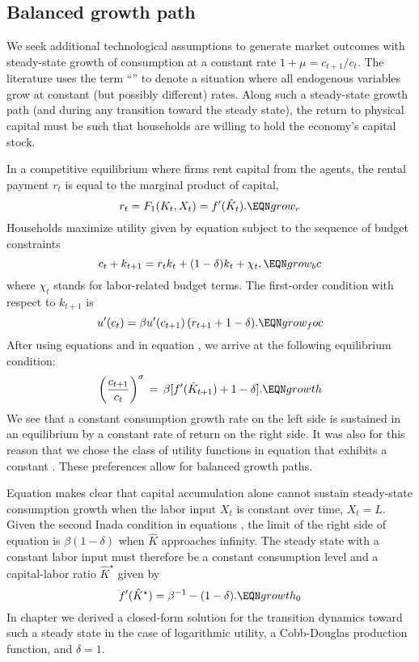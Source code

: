 \subsection{Balanced growth path}

We seek additional technological assumptions to
generate market outcomes with steady-state growth of consumption at a
constant rate $1+\mu=c_{t+1}/c_t$. The literature uses the term
``'' to denote a situation
where all endogenous variables grow at constant (but possibly different)
rates. Along such a steady-state growth path (and
during any transition toward the steady state), the return to
physical capital must be such that households are willing to hold the
economy's capital stock.

In a competitive equilibrium where firms
rent capital from the agents, the rental payment $r_t$ is equal to the
marginal product of capital,
$$
r_t = F_1(K_t,X_t) = f'(\hat K_t).                             \EQN grow_r
$$
Households
maximize utility given by equation  subject to the sequence of
 budget constraints
$$
c_t + k_{t+1} = r_t k_t + (1-\delta) k_t + \chi_t,         \EQN grow_bc
$$
where $\chi_t$ stands for labor-related budget terms. The
first-order condition with respect to $k_{t+1}$ is
$$
u'(c_t) = \beta u'(c_{t+1})\, (r_{t+1} + 1 - \delta).        \EQN grow_foc
$$
After using equations  and  in equation , we arrive
at the following equilibrium condition:
$$
\left({c_{t+1} \over c_t}\right)^\sigma \,=\, \beta [f'(\hat K_{t+1}) +1 - \delta].
                                                            \EQN growth
$$
We see that a constant consumption growth rate on the left  side is
sustained in an equilibrium
by a constant rate of return on the right  side. It was
also for this reason that we chose the class of utility functions in
equation  that exhibits a
constant .
These preferences allow for
balanced growth paths.

Equation  makes clear that capital accumulation alone cannot sustain
steady-state consumption growth when the labor input $X_t$ is constant over time,
$X_t=L$. Given the second Inada condition in equations
 , the limit
of the right  side of equation  is $\beta(1-\delta)$
when $\hat K$ approaches
infinity. The steady state with a constant labor input must therefore
be a constant consumption level and a capital-labor ratio $\hat K^{\star}$ given by
$$
f'(\hat K^{\star}) = \beta^{-1} - (1-\delta).                   \EQN growth_0
$$
In chapter 
 we derived a closed-form solution for the transition dynamics
toward such a steady state in the case of logarithmic utility, a Cobb-Douglas
production function, and $\delta=1$.

